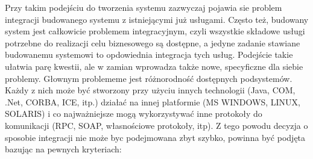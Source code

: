 Przy takim podejściu do tworzenia systemu zazwyczaj pojawia sie problem integracji budowanego systemu z istniejącymi już usługami. Często też, budowany system jest całkowicie problemem integracyjnym, czyli wszystkie składowe usługi potrzebne do realizacji celu biznesowego są dostępne, a jedyne zadanie stawiane budowanemu systemowi to opdowiednia integracja tych usług. Podejście takie ułatwia parę kwestii, ale w zamian wprowadza także nowe, specyficzne dla siebie problemy. Głownym problememe jest różnorodność dostępnych podsystemów. Każdy z nich może być stworzony przy użyciu innych technologii (Java, COM, .Net, CORBA, ICE, itp.) działać na innej platformie (MS WINDOWS, LINUX, SOLARIS) i co najważniejsze mogą wykorzystywać inne protokoły do komunikacji (RPC, SOAP, własnościowe protokoły, itp). Z tego powodu decyzja o sposobie integracji nie może byc podejmowana zbyt szybko,  powinna być podjęta bazując na pewnych kryteriach:  \cite{hohpewoolf2003} 


